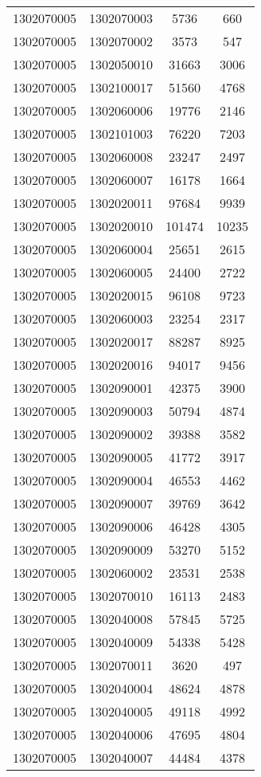 \begin{longtable}{llcc}
1302070005 & 1302070003 & 5736 & 660\\
1302070005 & 1302070002 & 3573 & 547\\
1302070005 & 1302050010 & 31663 & 3006\\
1302070005 & 1302100017 & 51560 & 4768\\
1302070005 & 1302060006 & 19776 & 2146\\
1302070005 & 1302101003 & 76220 & 7203\\
1302070005 & 1302060008 & 23247 & 2497\\
1302070005 & 1302060007 & 16178 & 1664\\
1302070005 & 1302020011 & 97684 & 9939\\
1302070005 & 1302020010 & 101474 & 10235\\
1302070005 & 1302060004 & 25651 & 2615\\
1302070005 & 1302060005 & 24400 & 2722\\
1302070005 & 1302020015 & 96108 & 9723\\
1302070005 & 1302060003 & 23254 & 2317\\
1302070005 & 1302020017 & 88287 & 8925\\
1302070005 & 1302020016 & 94017 & 9456\\
1302070005 & 1302090001 & 42375 & 3900\\
1302070005 & 1302090003 & 50794 & 4874\\
1302070005 & 1302090002 & 39388 & 3582\\
1302070005 & 1302090005 & 41772 & 3917\\
1302070005 & 1302090004 & 46553 & 4462\\
1302070005 & 1302090007 & 39769 & 3642\\
1302070005 & 1302090006 & 46428 & 4305\\
1302070005 & 1302090009 & 53270 & 5152\\
1302070005 & 1302060002 & 23531 & 2538\\
1302070005 & 1302070010 & 16113 & 2483\\
1302070005 & 1302040008 & 57845 & 5725\\
1302070005 & 1302040009 & 54338 & 5428\\
1302070005 & 1302070011 & 3620 & 497\\
1302070005 & 1302040004 & 48624 & 4878\\
1302070005 & 1302040005 & 49118 & 4992\\
1302070005 & 1302040006 & 47695 & 4804\\
1302070005 & 1302040007 & 44484 & 4378\\

\end{longtable}
